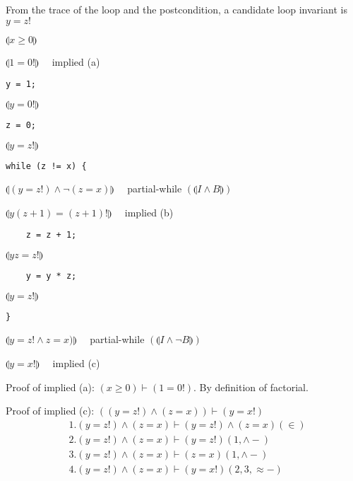 \documentclass{article}
\begin{document}
From the trace of the loop and the postcondition, a candidate loop invariant is $y = z!$

$\llparenthesis x \ge 0 \rrparenthesis$

$\llparenthesis 1 = 0! \rrparenthesis \quad$ implied (a)

\begin{verbatim}
y = 1;
\end{verbatim}

$\llparenthesis y= 0! \rrparenthesis$

\begin{verbatim}
z = 0;
\end{verbatim}

$\llparenthesis y = z! \rrparenthesis$

\begin{verbatim}
while (z != x) {
\end{verbatim}

$\llparenthesis ( y = z! ) \wedge \neg (z = x) \rrparenthesis \quad$ partial-while $( \llparenthesis I \wedge B \rrparenthesis )$

$\llparenthesis y (z + 1) = (z + 1)! \rrparenthesis \quad$ implied (b)

\begin{verbatim}
    z = z + 1;
\end{verbatim}

$\llparenthesis yz = z! \rrparenthesis$

\begin{verbatim}
    y = y * z;
\end{verbatim}

$\llparenthesis y = z! \rrparenthesis$

\begin{verbatim}
}
\end{verbatim}

$\llparenthesis y = z! \wedge z = x ) \rrparenthesis \quad $ partial-while $( \llparenthesis I \wedge \neg B \rrparenthesis )$

$\llparenthesis y = x! \rrparenthesis \quad $ implied (c)

Proof of implied (a): $(x \ge 0) \vdash (1 = 0!)$. By definition of factorial.

Proof of implied (c): $((y = z!) \wedge (z = x)) \vdash (y = x!)$
\begin{align*}
&1. (y = z!) \wedge (z = x) \vdash (y = z!) \wedge (z = x) (\in) \\
&2. (y = z!) \wedge (z = x) \vdash (y = z!) (1, \wedge -) \\
&3. (y = z!) \wedge (z = x) \vdash (z = x) (1, \wedge -) \\
&4. (y = z!) \wedge (z = x) \vdash (y = x!) (2,3,\approx -)
\end{align*}
\end{document}
